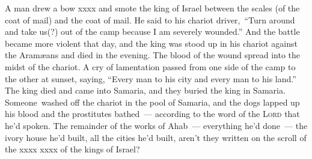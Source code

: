 \begin{inparaenum}
     A man drew a bow xxxx and smote the king of Israel between the scales (of the coat of mail) and the coat of mail. He said to his chariot driver,\understood\ ``Turn around and take us(?) out of the camp because I am severely wounded.''%
     And the battle became more violent that day, and the king was stood up in his chariot against the Aram\ae{}ans and died in the evening. The blood of the wound spread into the midst of the chariot.%
     A cry of lamentation passed from one side of the camp to the other at sunset, saying, ``Every man to his city and every man to his land.''%
     The king died and came into Samaria, and they buried the king in Samaria.%
     Someone\understood\ washed off the chariot in the pool of Samaria, and the dogs lapped up his blood and the prostitutes bathed~--- according to the word of the \textsc{Lord} that he'd spoken.%
     The remainder of the works of Ahab~--- everything he'd done~--- the ivory house he'd built, all the cities he'd built, aren't they written on the scroll of the xxxx xxxx of the kings of Israel?%
    
    
\end{inparaenum}
